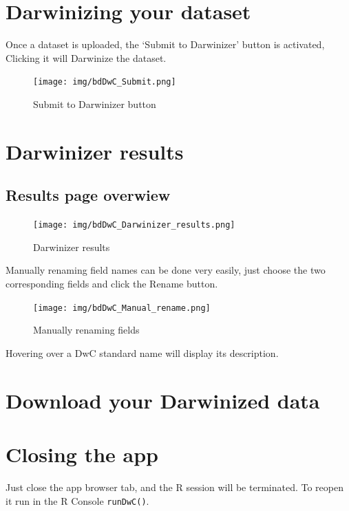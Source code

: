 \documentclass[]{book}
\begin{document}
\section{Darwinizing your dataset}\label{darwinizing-your-dataset}

Once a dataset is uploaded, the `Submit to Darwinizer' button is
activated, Clicking it will Darwinize the dataset.

\begin{figure}
\centering
\texttt{[image: img/bdDwC\_Submit.png]}
\caption{Submit to Darwinizer button}
\end{figure}

\section{Darwinizer results}\label{darwinizer-results}

\subsection{Results page overwiew}\label{results-page-overwiew}

\begin{figure}
\centering
\texttt{[image: img/bdDwC\_Darwinizer\_results.png]}
\caption{Darwinizer results}
\end{figure}

Manually renaming field names can be done very easily, just choose the
two corresponding fields and click the Rename button.

\begin{figure}
\centering
\texttt{[image: img/bdDwC\_Manual\_rename.png]}
\caption{Manually renaming fields}
\end{figure}

Hovering over a DwC standard name will display its description.

\section{Download your Darwinized
data}\label{download-your-darwinized-data}

\section{Closing the app}\label{closing-the-app}

Just close the app browser tab, and the R session will be terminated. To
reopen it run in the R Console \texttt{runDwC()}.
\end{document}
